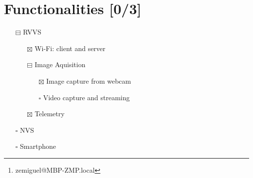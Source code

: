 \documentclass[11pt]{article}
\author{José Miguel Alves Pires\thanks{zemiguel@MBP-ZMP.local}}
\date{\today}
\title{}
\begin{document}
\tableofcontents

\section{Functionalities [0/3]}
\label{sec:org88176f5}
\begin{itemize}
\item[{$\boxminus$}] RVVS
\begin{itemize}
\item[{$\boxtimes$}] Wi-Fi: client and server
\item[{$\boxminus$}] Image Aquisition
\begin{itemize}
\item[{$\boxtimes$}] Image capture from webcam
\item[{$\square$}] Video capture and streaming
\end{itemize}
\item[{$\boxtimes$}] Telemetry
\end{itemize}
\item[{$\square$}] NVS
\item[{$\square$}] Smartphone
\end{itemize}
\end{document}
